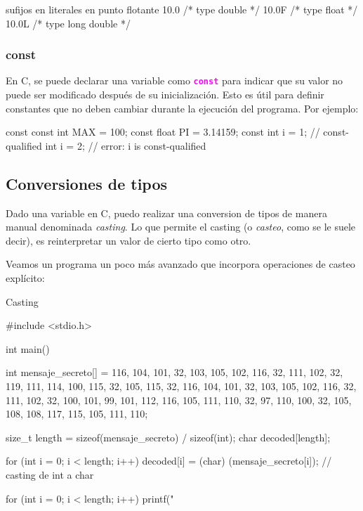 \documentclass[]{scrartcl}
\newcommand{\hl}[1]{\textcolor{magenta}{\textbf{\texttt{#1}}}}
\begin{document}
\begin{cbox}{sufijos en literales en punto flotante}
  10.0   /* type double */
  10.0F  /* type float */
  10.0L  /* type long double */
\end{cbox}


\subsubsection*{const}

En C, se puede declarar una variable como \hl{const} para indicar que su valor no puede ser modificado después de su inicialización. Esto es útil para definir constantes que no deben cambiar durante la ejecución del programa. Por ejemplo:

\begin{cbox}{const}
  const int MAX = 100;
  const float PI = 3.14159;
  const int i = 1; // const-qualified int
  i = 2;           // error: i is const-qualified
\end{cbox}

\subsection*{Conversiones de tipos}
Dado una variable en C, puedo realizar una conversion de tipos de manera manual denominada \textit{casting}. Lo que permite el casting (o \textit{casteo}, como se le suele decir), es reinterpretar un valor de cierto tipo como otro.

Veamos un programa un poco más avanzado que incorpora operaciones de casteo explícito:
\begin{cbox}[]{Casting}

  #include <stdio.h>
 
  int main() {
    int mensaje_secreto[] = {116, 104, 101, 32, 103, 105, 102, 116, 32, 111, 
    102, 32, 119, 111, 114, 100, 115, 32, 105, 115, 32, 116, 104, 101, 32, 
    103, 105, 102, 116, 32, 111, 102, 32, 100, 101, 99, 101, 112, 116, 105, 
    111, 110, 32, 97, 110, 100, 32, 105, 108, 108, 117, 115, 105, 111, 110};

    size_t length = sizeof(mensaje_secreto) / sizeof(int);
    char decoded[length];
    
    for (int i = 0; i < length; i++) {
      decoded[i] = (char) (mensaje_secreto[i]); // casting de int a char
    }
  
    for (int i = 0; i < length; i++) {
      printf("%
    }
  }

\end{cbox}
\end{document}
